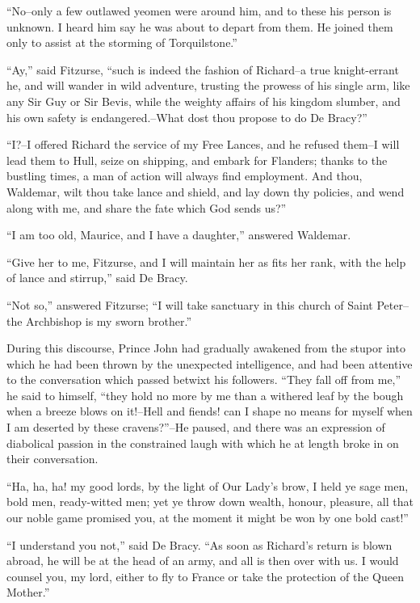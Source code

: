 ``No--only a few outlawed yeomen were around him, and to these his
person is unknown. I heard him say he was about to depart from them. He
joined them only to assist at the storming of Torquilstone.''

``Ay,'' said Fitzurse, ``such is indeed the fashion of Richard--a true
knight-errant he, and will wander in wild adventure, trusting the
prowess of his single arm, like any Sir Guy or Sir Bevis, while the
weighty affairs of his kingdom slumber, and his own safety is
endangered.--What dost thou propose to do De Bracy?''

``I?--I offered Richard the service of my Free Lances, and he refused
them--I will lead them to Hull, seize on shipping, and embark for
Flanders; thanks to the bustling times, a man of action will always find
employment. And thou, Waldemar, wilt thou take lance and shield, and lay
down thy policies, and wend along with me, and share the fate which God
sends us?''

``I am too old, Maurice, and I have a daughter,'' answered Waldemar.

``Give her to me, Fitzurse, and I will maintain her as fits her rank,
with the help of lance and stirrup,'' said De Bracy.

``Not so,'' answered Fitzurse; ``I will take sanctuary in this church of
Saint Peter--the Archbishop is my sworn brother.''

During this discourse, Prince John had gradually awakened from the
stupor into which he had been thrown by the unexpected intelligence, and
had been attentive to the conversation which passed betwixt his
followers. ``They fall off from me,'' he said to himself, ``they hold no
more by me than a withered leaf by the bough when a breeze blows on
it!--Hell and fiends! can I shape no means for myself when I am deserted
by these cravens?''--He paused, and there was an expression of
diabolical passion in the constrained laugh with which he at length
broke in on their conversation.

``Ha, ha, ha! my good lords, by the light of Our Lady's brow, I held ye
sage men, bold men, ready-witted men; yet ye throw down wealth, honour,
pleasure, all that our noble game promised you, at the moment it might
be won by one bold cast!''

``I understand you not,'' said De Bracy. ``As soon as Richard's return
is blown abroad, he will be at the head of an army, and all is then over
with us. I would counsel you, my lord, either to fly to France or take
the protection of the Queen Mother.''

